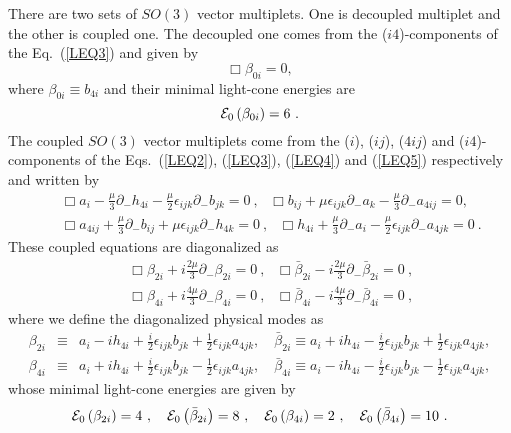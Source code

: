 \documentclass[a4paper,12pt]{article}
\numberwithin{equation}{section}
\begin{document}
There are two sets of $SO(3)$ vector multiplets. One is decoupled
multiplet and the other is coupled one. The decoupled one comes from
the ($i4$)-components of the Eq.~(\ref{LEQ3}) and given by
\begin{equation}\label{decoup1}
\Box \beta_{0i} = 0,
\end{equation}
where $\beta_{0i} \equiv b_{4i}$ and their
minimal light-cone energies are
\begin{equation}
{\cal E}_0\left(\beta_{0i}\right) = 6~.
\end{equation}
The coupled $SO(3)$ vector multiplets come from the ($i$), ($ij$),
($4ij$) and ($i4$)-components of the Eqs.~(\ref{LEQ2}),
(\ref{LEQ3}), (\ref{LEQ4}) and (\ref{LEQ5}) respectively and
written by
\begin{eqnarray}
&& \Box a_i - \frac{\mu}3 \partial_- h_{4i}
         - \frac{\mu}2 \epsilon_{ijk}\partial_- b_{jk} = 0 ~,~~~
   \Box b_{ij} + \mu \epsilon_{ijk}\partial_- a_k
         - \frac{\mu}3 \partial_- a_{4ij} = 0,
 \nonumber  \\
&& \Box a_{4ij} + \frac{\mu}3 \partial_- b_{ij}
         + \mu \epsilon_{ijk} \partial_- h_{4k} = 0 ~,~~~
   \Box h_{4i}  + \frac{\mu}3 \partial_- a_i
         - \frac{\mu}2 \epsilon_{ijk}\partial_- a_{4jk} = 0 ~.
\label{coup2}
\end{eqnarray}
These coupled equations are diagonalized as
\begin{eqnarray}
&& \Box \beta_{2i}
        + i \frac{2\mu}{3} \partial_- \beta_{2i} = 0 ~,~~~
   \Box \bar\beta_{2i}
        - i \frac{2\mu}{3} \partial_- \bar\beta_{2i} = 0 ~,
 \nonumber  \\
&& \Box \beta_{4i}
        + i \frac{4\mu}{3} \partial_- \beta_{4i} = 0 ~,~~~
   \Box \bar\beta_{4i}
        - i \frac{4\mu}{3} \partial_- \bar\beta_{4i} = 0 ~,
\label{dia2}
\end{eqnarray}
where we define the diagonalized physical modes as
\begin{eqnarray}
\beta_{2i} &\equiv& a_i - i h_{4i} + \frac{i}2\epsilon_{ijk}
b_{jk}
               + \frac12\epsilon_{ijk}a_{4jk},
\quad \bar\beta_{2i} \equiv a_i + i h_{4i} -
\frac{i}2\epsilon_{ijk} b_{jk}
                + \frac12\epsilon_{ijk}a_{4jk},
\nonumber \\
\beta_{4i} &\equiv& a_i + i h_{4i} + \frac{i}2\epsilon_{ijk}
b_{jk}
                - \frac12\epsilon_{ijk}a_{4jk},
\quad \bar\beta_{4i} \equiv a_i - i h_{4i} -
\frac{i}2\epsilon_{ijk} b_{jk}
               - \frac12\epsilon_{ijk}a_{4jk},
\label{mod2}
\end{eqnarray}
whose minimal light-cone energies are given by
\begin{equation}\label{eng2}
{\cal E}_0\left( \beta_{2i}\right) = 4 ~,~~~
{\cal E}_0\left( \bar\beta_{2i}\right) = 8 ~,~~~
{\cal E}_0\left( \beta_{4i}\right) = 2 ~,~~~
{\cal E}_0\left( \bar\beta_{4i}\right) = 10~.
\end{equation}
\end{document}
